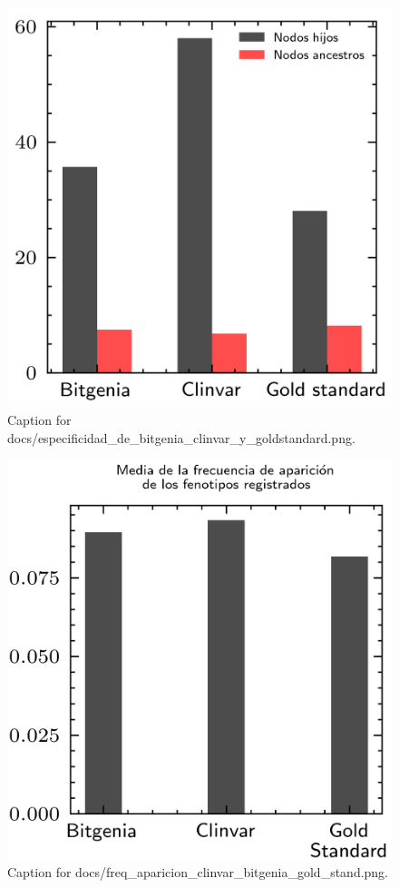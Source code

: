 \documentclass{article}
\begin{document}
\begin{figure}[h] \centering \includegraphics{docs/especificidad_de_bitgenia_clinvar_y_goldstandard.png} \caption{Caption for docs/especificidad_de_bitgenia_clinvar_y_goldstandard.png.} \end{figure}
\begin{figure}[h] \centering \includegraphics{docs/freq_aparicion_clinvar_bitgenia_gold_stand.png} \caption{Caption for docs/freq_aparicion_clinvar_bitgenia_gold_stand.png.} \end{figure}
\end{document}
